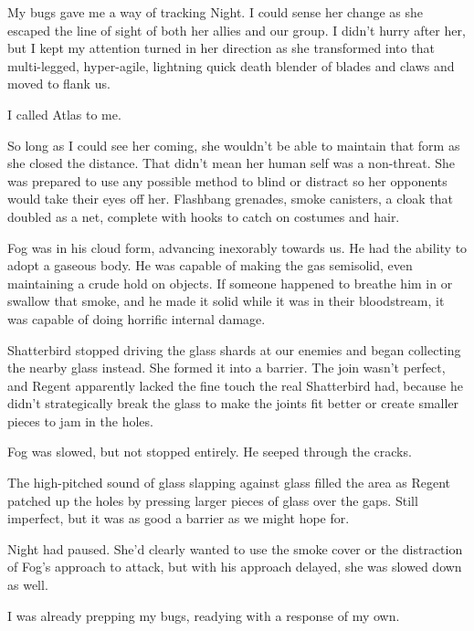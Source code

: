 My bugs gave me a way of tracking Night.  I could sense her change as she escaped the line of sight of both her allies and our group.  I didn't hurry after her, but I kept my attention turned in her direction as she transformed into that multi-legged, hyper-agile, lightning quick death blender of blades and claws and moved to flank us.



I called Atlas to me.



So long as I could see her coming, she wouldn't be able to maintain that form as she closed the distance.  That didn't mean her human self was a non-threat.  She was prepared to use any possible method to blind or distract so her opponents would take their eyes off her.  Flashbang grenades, smoke canisters, a cloak that doubled as a net, complete with hooks to catch on costumes and hair.



Fog was in his cloud form, advancing inexorably towards us.  He had the ability to adopt a gaseous body.  He was capable of making the gas semisolid, even maintaining a crude hold on objects.  If someone happened to breathe him in or swallow that smoke, and he made it solid while it was in their bloodstream, it was capable of doing horrific internal damage.



Shatterbird stopped driving the glass shards at our enemies and began collecting the nearby glass instead.  She formed it into a barrier.  The join wasn't perfect, and Regent apparently lacked the fine touch the real Shatterbird had, because he didn't strategically break the glass to make the joints fit better or create smaller pieces to jam in the holes.



Fog was slowed, but not stopped entirely.  He seeped through the cracks.



The high-pitched sound of glass slapping against glass filled the area as Regent patched up the holes by pressing larger pieces of glass over the gaps.  Still imperfect, but it was as good a barrier as we might hope for.



Night had paused.  She'd clearly wanted to use the smoke cover or the distraction of Fog's approach to attack, but with his approach delayed, she was slowed down as well.



I was already prepping my bugs, readying with a response of my own.




